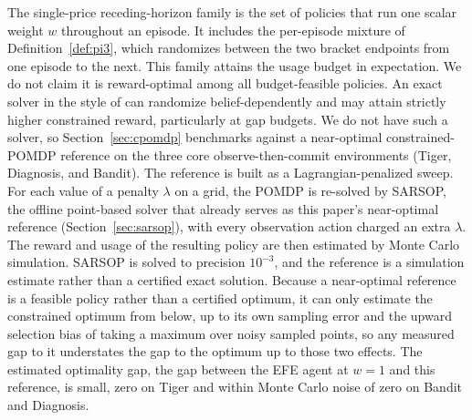 The single-price receding-horizon family is the set of policies that run one scalar weight $w$ throughout an episode. It includes the per-episode mixture of Definition~\ref{def:pi3}, which randomizes between the two bracket endpoints from one episode to the next. This family attains the usage budget in expectation. We do not claim it is reward-optimal among all budget-feasible policies. An exact solver in the style of \citet{kim2011cpomdp} can randomize belief-dependently and may attain strictly higher constrained reward, particularly at gap budgets. We do not have such a solver, so Section~\ref{sec:cpomdp} benchmarks against a near-optimal constrained-POMDP reference on the three core observe-then-commit environments (Tiger, Diagnosis, and Bandit). The reference is built as a Lagrangian-penalized sweep. For each value of a penalty $\lambda$ on a grid, the POMDP is re-solved by SARSOP, the offline point-based solver that already serves as this paper's near-optimal reference (Section~\ref{sec:sarsop}), with every observation action charged an extra $\lambda$. The reward and usage of the resulting policy are then estimated by Monte Carlo simulation. SARSOP is solved to precision $10^{-3}$, and the reference is a simulation estimate rather than a certified exact solution. Because a near-optimal reference is a feasible policy rather than a certified optimum, it can only estimate the constrained optimum from below, up to its own sampling error and the upward selection bias of taking a maximum over noisy sampled points, so any measured gap to it understates the gap to the optimum up to those two effects. The estimated optimality gap, the gap between the EFE agent at $w{=}1$ and this reference, is small, zero on Tiger and within Monte Carlo noise of zero on Bandit and Diagnosis.

